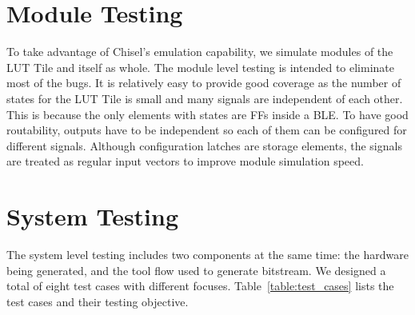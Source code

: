 \section{Module Testing}
\label{sec:mod_test}

To take advantage of Chisel's emulation capability, we simulate modules of the LUT Tile
and itself as whole. The module level testing is intended to eliminate most of the
bugs. It is relatively easy to provide good coverage as the number of states for the LUT
 Tile is small and many signals are independent of each other. This is because the only elements
with states are FFs inside a BLE. To have good routability, outputs have to be independent 
so each of them can be configured for different signals. Although configuration latches are storage
elements, the signals are treated as regular input vectors to improve module simulation speed. \par

\section{System Testing}
\label{sec:sys_perf}

The system level testing includes two components at the same time: the hardware being
generated, and the tool flow used to generate bitstream. We designed a total of eight
test cases with different focuses. Table~\ref{table:test_cases} lists the test cases
and their testing objective. \par

